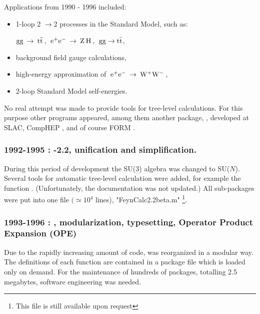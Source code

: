 Applications from 1990 - 1996  included:

\begin{itemize}

\item 1-loop 2 \(\rightarrow \)2 processes in the Standard
Model, such as:

\({\rm gg}\> \rightarrow \> 
{\rm t \overline{t}} \> , \> \>
{{\rm e}^+}{{\rm e}^-}\> \rightarrow \> {\rm Z}\> {\rm H}\>, \> \>
{\rm gg} \rightarrow {\rm t\bar{t}} \),

\item background field gauge calculations,

\item high-energy approximation of \(\>{{\rm e}^+}
{{\rm e}^-}\> \rightarrow \> {{\rm W}^+}{{\rm W}^-}\> \),

\item  2-loop Standard Model self-energies.

\end{itemize}

No real attempt was made to provide tools for tree-level calculations. 
For this purpose other programs appeared, among them another  \mma package, \hip \cite{yeh}, developed at SLAC, 
CompHEP \cite{comphep}, and of course FORM \cite{form}.

\subsubsection*{1992-1995 : -2.2, unification and simplification.}

During this period of development the SU(3) algebra was changed to SU($N$). Several tools for automatic tree-level calculation were added, for example the function . (Unfortunately, the  documentation was not updated.) All sub-packages were put into one file \(\big(\simeq {{10}^4}\) lines), "FeynCalc2.2beta.m" \footnote{This file is still available upon request}.

\subsubsection*{1993-1996 : , modularization, typesetting, Operator Product Expansion (OPE)}

Due to the rapidly increasing amount of code, \fc was reorganized in a modular way. The definitions of each function are contained in a package file which is loaded only on demand. For the maintenance of hundreds of packages, totalling 2.5 megabytes, software engineering was needed.

